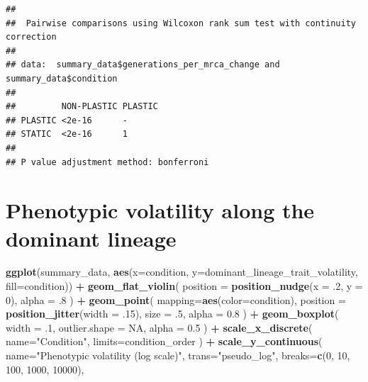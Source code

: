 \documentclass[]{book}
\newenvironment{Shaded}{\begin{snugshade}}{\end{snugshade}}
\newcommand{\DataTypeTok}[1]{\textcolor[rgb]{0.13,0.29,0.53}{#1}}
\newcommand{\DecValTok}[1]{\textcolor[rgb]{0.00,0.00,0.81}{#1}}
\newcommand{\FloatTok}[1]{\textcolor[rgb]{0.00,0.00,0.81}{#1}}
\newcommand{\KeywordTok}[1]{\textcolor[rgb]{0.13,0.29,0.53}{\textbf{#1}}}
\newcommand{\NormalTok}[1]{#1}
\newcommand{\OperatorTok}[1]{\textcolor[rgb]{0.81,0.36,0.00}{\textbf{#1}}}
\newcommand{\OtherTok}[1]{\textcolor[rgb]{0.56,0.35,0.01}{#1}}
\newcommand{\StringTok}[1]{\textcolor[rgb]{0.31,0.60,0.02}{#1}}
\begin{document}
\begin{verbatim}
## 
##  Pairwise comparisons using Wilcoxon rank sum test with continuity correction 
## 
## data:  summary_data$generations_per_mrca_change and summary_data$condition 
## 
##         NON-PLASTIC PLASTIC
## PLASTIC <2e-16      -      
## STATIC  <2e-16      1      
## 
## P value adjustment method: bonferroni
\end{verbatim}

\hypertarget{phenotypic-volatility-along-the-dominant-lineage-1}{%
\section{Phenotypic volatility along the dominant lineage}\label{phenotypic-volatility-along-the-dominant-lineage-1}}

\begin{Shaded}
\begin{Highlighting}[]
\KeywordTok{ggplot}\NormalTok{(summary_data, }\KeywordTok{aes}\NormalTok{(}\DataTypeTok{x=}\NormalTok{condition, }\DataTypeTok{y=}\NormalTok{dominant_lineage_trait_volatility, }\DataTypeTok{fill=}\NormalTok{condition)) }\OperatorTok{+}
\StringTok{  }\KeywordTok{geom_flat_violin}\NormalTok{(}
    \DataTypeTok{position =} \KeywordTok{position_nudge}\NormalTok{(}\DataTypeTok{x =} \FloatTok{.2}\NormalTok{, }\DataTypeTok{y =} \DecValTok{0}\NormalTok{),}
    \DataTypeTok{alpha =} \FloatTok{.8}
\NormalTok{  ) }\OperatorTok{+}
\StringTok{  }\KeywordTok{geom_point}\NormalTok{(}
    \DataTypeTok{mapping=}\KeywordTok{aes}\NormalTok{(}\DataTypeTok{color=}\NormalTok{condition),}
    \DataTypeTok{position =} \KeywordTok{position_jitter}\NormalTok{(}\DataTypeTok{width =} \FloatTok{.15}\NormalTok{),}
    \DataTypeTok{size =} \FloatTok{.5}\NormalTok{,}
    \DataTypeTok{alpha =} \FloatTok{0.8}
\NormalTok{  ) }\OperatorTok{+}
\StringTok{  }\KeywordTok{geom_boxplot}\NormalTok{(}
    \DataTypeTok{width =} \FloatTok{.1}\NormalTok{,}
    \DataTypeTok{outlier.shape =} \OtherTok{NA}\NormalTok{,}
    \DataTypeTok{alpha =} \FloatTok{0.5}
\NormalTok{  ) }\OperatorTok{+}
\StringTok{  }\KeywordTok{scale_x_discrete}\NormalTok{(}
    \DataTypeTok{name=}\StringTok{"Condition"}\NormalTok{,}
    \DataTypeTok{limits=}\NormalTok{condition_order}
\NormalTok{  ) }\OperatorTok{+}
\StringTok{  }\KeywordTok{scale_y_continuous}\NormalTok{(}
    \DataTypeTok{name=}\StringTok{"Phenotypic volatility (log scale)"}\NormalTok{,}
    \DataTypeTok{trans=}\StringTok{"pseudo_log"}\NormalTok{,}
    \DataTypeTok{breaks=}\KeywordTok{c}\NormalTok{(}\DecValTok{0}\NormalTok{, }\DecValTok{10}\NormalTok{, }\DecValTok{100}\NormalTok{, }\DecValTok{1000}\NormalTok{, }\DecValTok{10000}\NormalTok{),}

\end{Highlighting}
\end{Shaded}
\end{document}
